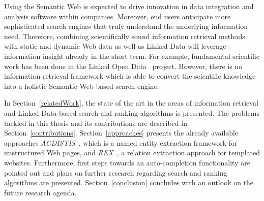 Using the Semantic Web is expected to drive innovation in data integration and analysis software within companies.
Moreover, end users anticipate more sophisticated search engines that truly understand the underlying information need.
Therefore, combining scientifically sound information retrieval methods with static and dynamic Web data as well as Linked Data will leverage information insight already in the short term.
For example, fundamental scientific work has been done in the Linked Open Data~\cite{lod2} project.
However, there is no information retrieval framework which is able to convert the scientific knowledge into a holistic Semantic Web-based search engine.

In Section~\ref{relatedWork}, the state of the art in the areas of information retrieval and Linked Data-based search and ranking algorithms is presented. 
The problems tackled in this thesis and its contributions are described in Section~\ref{contributions}.
Section~\ref{approaches} presents the already available approaches \emph{AGDISTIS}~\cite{AGDISTIS}, which is a named entity extraction framework for unstructured Web pages, and \emph{REX}~\cite{REX}, a relation extraction approach for templated websites. 
Furthermore, first steps towards an auto-completion functionality are pointed out and plans on further research regarding search and ranking algorithms are presented. 
Section~\ref{conclusion} concludes with an outlook on the future research agenda.

